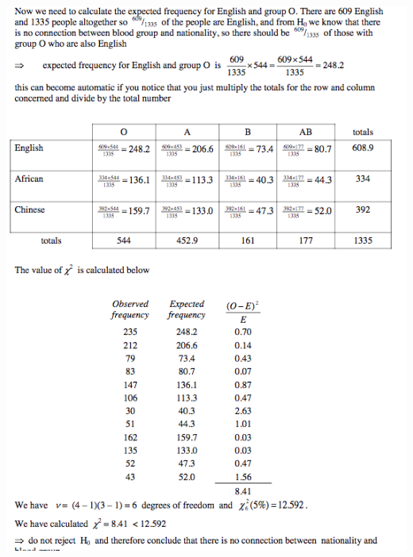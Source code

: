 \documentclass[a4paper]{article}
\begin{document}
\begin{center}
	\includegraphics[scale=0.5]{img_S/19_eg6}
\end{center}
\end{document}
